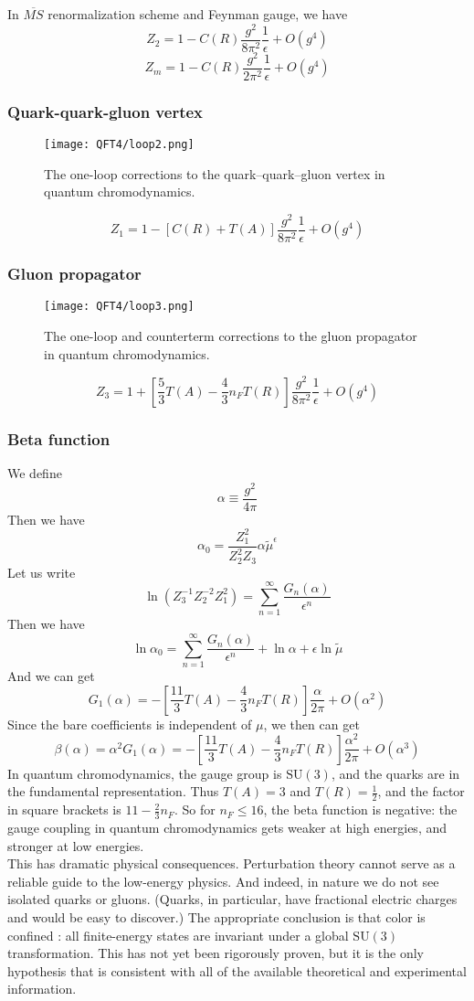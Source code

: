 \noindent
In $\overline{MS}$ renormalization scheme and Feynman gauge, we have
\[Z_2 = 1 - C(R)\frac{g^2}{8\pi^2}\frac{1}{\epsilon} + O(g^4)\]
\[Z_m = 1 - C(R)\frac{g^2}{2\pi^2}\frac{1}{\epsilon} + O(g^4)\]

\subsubsection{Quark-quark-gluon vertex}
\begin{figure}[!h]
	\centering
	\texttt{[image: QFT4/loop2.png]}
	\caption{The one-loop corrections to the quark–quark–gluon vertex in quantum chromodynamics.}
\end{figure}
\[Z_1 = 1 - [C(R) + T(A)]\frac{g^2}{8\pi^2}\frac{1}{\epsilon} + O(g^4)\]

\subsubsection{Gluon propagator}
\begin{figure}[!h]
	\centering
	\texttt{[image: QFT4/loop3.png]}
	\caption{The one-loop and counterterm corrections to the gluon propagator in quantum chromodynamics.}
\end{figure}
\[Z_3 = 1 + \left[\frac{5}{3}T(A) - \frac{4}{3}n_F T(R)\right]\frac{g^2}{8\pi^2}\frac{1}{\epsilon} + O(g^4)\]

\subsubsection{Beta function}
We define
\[\alpha \equiv \frac{g^2}{4\pi}\]
Then we have
\[\alpha_0 = \frac{Z_1^2}{Z_2^2 Z_3} \alpha \tilde{\mu}^{\epsilon}\]
Let us write
\[\ln \left( Z_3^{-1}Z_2^{-2}Z_1^2 \right) = \sum_{n=1}^{\infty} \frac{G_n(\alpha)}{\epsilon^n}\]
Then we have
\[\ln \alpha_0 = \sum_{n=1}^{\infty} \frac{G_n(\alpha)}{\epsilon^n} + \ln \alpha + \epsilon \ln \tilde{\mu}\]
And we can get
\[G_1(\alpha) = - \left[ \frac{11}{3}T(A) - \frac{4}{3} n_F T(R) \right] \frac{\alpha}{2\pi} + O(\alpha^2)\]
Since the bare coefficients is independent of $\mu$, we then can get
\[\beta(\alpha) = \alpha^2 G_1(\alpha) = - \left[ \frac{11}{3}T(A) - \frac{4}{3} n_F T(R) \right] \frac{\alpha^2}{2\pi} + O(\alpha^3)\]
In quantum chromodynamics, the gauge group is $\mathrm{SU}(3)$, and the quarks are in the fundamental representation. Thus $T(A) = 3$ and $T(R) = \frac{1}{2}$, and the factor in square brackets is $11 - \frac{2}{3} n_F$. So for $n_F \leq 16$, the beta function is negative: the gauge coupling in quantum chromodynamics gets weaker at high energies, and stronger at low energies.\\
This has dramatic physical consequences. Perturbation theory cannot serve as a reliable guide to the low-energy physics. And indeed, in nature we do not see isolated quarks or gluons. (Quarks, in particular, have fractional electric charges and would be easy to discover.) The appropriate conclusion is that color is confined : all finite-energy states are invariant under a global $\mathrm{SU}(3)$ transformation. This has not yet been rigorously proven, but it is the
only hypothesis that is consistent with all of the available theoretical and experimental information.

